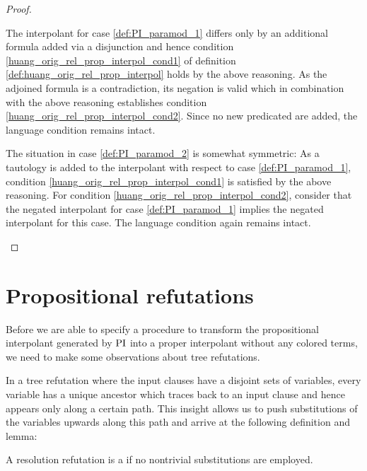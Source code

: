\begin{proof}
\begin{indproof}
			The interpolant for case \ref{def:PI_paramod_1} differs only by an additional formula added via a disjunction and hence condition \ref{huang_orig_rel_prop_interpol_cond1} of definition \ref{def:huang_orig_rel_prop_interpol} holds by the above reasoning.
			As the adjoined formula is a contradiction, its negation is valid which in combination with the above reasoning establishes condition \ref{huang_orig_rel_prop_interpol_cond2}.
			Since no new predicated are added, the language condition remains intact. 

			The situation in case \ref{def:PI_paramod_2} is somewhat symmetric: 
			As a tautology is added to the interpolant with respect to case \ref{def:PI_paramod_1}, condition \ref{huang_orig_rel_prop_interpol_cond1} is satisfied by the above reasoning.
			For condition \ref{huang_orig_rel_prop_interpol_cond2}, consider that the negated interpolant for case \ref{def:PI_paramod_1} implies the negated interpolant for this case.
			The language condition again remains intact.
			\qedhere
	\end{indproof}
\end{proof}

\section{Propositional refutations}
Before we are able to specify a procedure to transform the propositional interpolant generated by $\operatorname{PI}$ into a proper interpolant without any colored terms,
we need to make some observations about tree refutations.

In a tree refutation where the input clauses have a disjoint sets of variables, every variable has a unique ancestor which traces back to an input clause and hence appears only along a certain path.
This insight allows us to push substitutions of the variables upwards along this path and arrive at the following definition and lemma:




\begin{defi}
	A resolution refutation is a  if no nontrivial substitutions are employed.
\end{defi}

